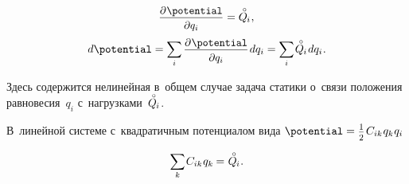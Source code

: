 \begin{otherlanguage}{russian}
\nopagebreak\vspace{-0.1em}\begin{equation}\label{staticequilibriumwithpotentialenergy}
\scalebox{0.96}{$ \displaystyle \frac{\raisemath{-0.15em}{\partial \hspace{.1ex} \potential}}{\raisemath{-0.1em}{\partial q_i}} $} = \mathcircabove{Q}_{\hspace{-0.1ex}i}
\hspace{.1ex},
\end{equation}
\nopagebreak\vspace{.1em}\begin{equation*}
d\potential = \scalebox{0.95}[1]{$\displaystyle \sum_{\smash{i}}$} \hspace{.32ex}
\scalebox{0.96}{$ \displaystyle \frac{\raisemath{-0.15em}{\partial \hspace{.1ex} \potential}}{\raisemath{-0.1em}{\partial q_i}} $} \hspace{.2ex} dq_i
= \scalebox{0.95}[1]{$\displaystyle \sum_{\smash{i}}$} \hspace{.2ex} \mathcircabove{Q}_{\hspace{-0.1ex}i} \hspace{.2ex} dq_i
\hspace{.1ex} .
\end{equation*}

\vspace{-0.5em}\noindent
Здесь содержится нелинейная в~общем случае задача статики о~связи положения равновесия~$q_i$ с~нагрузками~${\mathcircabove{Q}_{\hspace{-0.1ex}i}}$.

В~линейной системе с~квадратичным потенциалом вида ${\potential = \smalldisplaystyleonehalf \hspace{.2ex} C_{ik} \hspace{.12ex} q_{k} \hspace{.1ex} q_{i}}$

\nopagebreak\vspace{-1.25em}\begin{equation}\label{staticsoflineardiscretesystem}
\scalebox{0.95}[1]{$\displaystyle \sum_{\smash{k}}$} \hspace{.2ex} C_{ik} \hspace{.12ex} q_k \hspace{-0.1ex}
= \hspace{.1ex} \mathcircabove{Q}_{\hspace{-0.1ex}i} \hspace{.1ex} .
\vspace{-0.1em}\end{equation}


\end{otherlanguage}
